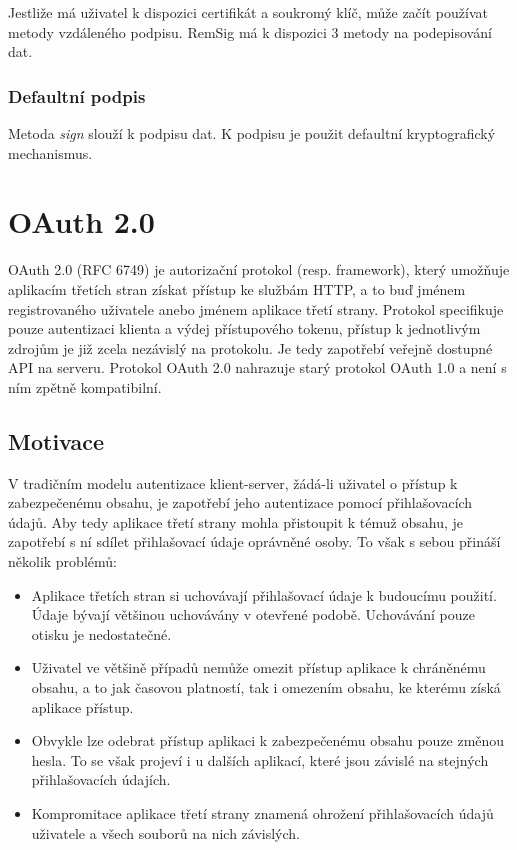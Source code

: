 \documentclass[]{fithesis3}
\begin{document}
	Jestliže má uživatel k dispozici certifikát a soukromý klíč, může začít používat metody 				vzdáleného podpisu. RemSig má k dispozici 3 metody na podepisování dat.

		\subsection{Defaultní podpis}
		Metoda \textit{sign} slouží k podpisu dat. K podpisu je použit defaultní kryptografický 				mechanismus.

\chapter{OAuth 2.0}

OAuth 2.0 (RFC 6749) je autorizační protokol (resp. framework), který umožňuje aplikacím třetích stran získat přístup ke službám HTTP, a to buď jménem registrovaného uživatele anebo jménem aplikace třetí strany. Protokol specifikuje pouze autentizaci klienta a výdej přístupového tokenu, přístup k jednotlivým zdrojům je již zcela nezávislý na protokolu. Je tedy zapotřebí veřejně dostupné API na serveru. Protokol OAuth 2.0 nahrazuje starý protokol OAuth 1.0 a není s ním zpětně kompatibilní.

	\section{Motivace}

	V tradičním modelu autentizace klient-server, žádá-li uživatel o přístup k zabezpečenému 			obsahu, je zapotřebí jeho autentizace pomocí přihlašovacích údajů. Aby tedy aplikace třetí 			strany mohla přistoupit k témuž obsahu, je zapotřebí s ní sdílet přihlašovací údaje oprávněné 		osoby. To však s sebou přináší několik problémů:

		\begin{itemize}
  		\item 
		Aplikace třetích stran si uchovávají přihlašovací údaje k budoucímu použití. Údaje bývají 			většinou uchovávány v otevřené podobě. Uchovávání pouze otisku je nedostatečné.

 		 \item 
		Uživatel ve většině případů nemůže omezit přístup aplikace k chráněnému obsahu, a to 			jak časovou platností, tak i omezením obsahu, ke kterému získá aplikace přístup.

 		 \item 
		Obvykle lze odebrat přístup aplikaci k zabezpečenému obsahu pouze 							změnou hesla. To se však projeví i u dalších aplikací, které jsou závislé na stejných 				přihlašovacích údajích.

  		\item 
		Kompromitace aplikace třetí strany znamená ohrožení přihlašovacích údajů 						uživatele a všech souborů na nich závislých.
		\end{itemize}
\end{document}
